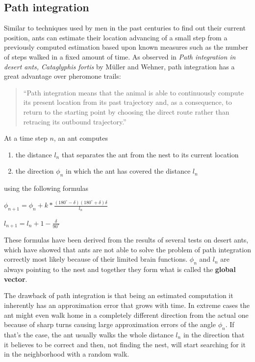 \documentclass[11pt]{article}
\begin{document}
\subsection{Path integration}

Similar to techniques used by men in the past centuries to find out their current position, ants can estimate their location advancing of a small step from a previously computed estimation based upon known measures such as the number of steps walked in a fixed amount of time. As observed in \emph{Path integration in desert ants, Cataglyphis fortis} by M\"{u}ller and Wehner, path integration has a great advantage over pheromone trails:
\begin{center}
	\begin{quotation}
		``Path integration means that the animal is able to continuously compute its present location from its past trajectory and, as
		a consequence, to return to the starting point by choosing the direct route rather than retracing its outbound trajectory.''
	\end{quotation}
\end{center}

At a time step $n$, an ant computes
\begin{enumerate}
\item the distance $l_n$ that separates the ant from the nest to its current location
\item the direction $\phi_n$ in which the ant has covered the distance $l_n$
\end{enumerate}

using the following formulas

\begin{center}
$\phi_{n+1} = \phi_n + k*\frac{(180^{\circ} - \delta)(180^{\circ} + \delta) \delta}{l_n}$
\end{center}
\begin{center}
$l_{n+1} = l_n + 1 - \frac{\delta}{90^{\circ}}$
\end{center}

These formulas have been derived from the results of several tests on desert ants, which have showed that ants are not able to solve the problem of path integration correctly most likely because of their limited brain functions. $\phi_n$ and $l_n$ are always pointing to the nest and together they form what is called the \textbf{global vector}.

The drawback of path integration is that being an estimated computation it inherently has an approximation error that grows with time. In extreme cases the ant might even walk home in a completely different direction from the actual one because of sharp turns causing large approximation errors of the angle $\phi_n$. If that's the case, the ant usually walks the whole distance $l_n$ in the direction that it believes to be correct and then, not finding the nest, will start searching for it in the neighborhood with a random walk.
\end{document}
